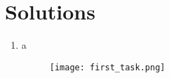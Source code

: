 \documentclass{article}
\begin{document}

\section*{Solutions}
\begin{enumerate}
    \item a 
    \begin{figure}[t]
        \centering
        \texttt{[image: first\_task.png]} %
    \end{figure}
\end{enumerate}
\end{document}
